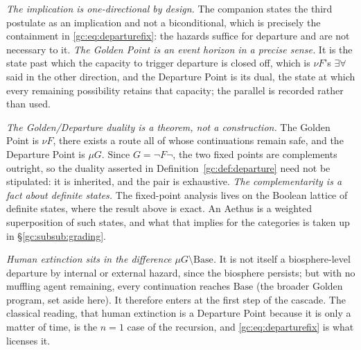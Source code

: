 \begin{remark}
\emph{The implication is one-directional by design.} The companion
states the third postulate as an implication and not a biconditional,
which is precisely the containment in \eqref{gc:eq:departurefix}: the
hazards suffice for departure and are not necessary to it. \emph{The Golden Point is an event horizon in a precise sense.} It is
the state past which the capacity to trigger departure is closed off,
which is $\nu F$'s $\exists\forall$ said in the other direction, and
the Departure Point is its dual, the state at which every remaining
possibility retains that capacity; the parallel is recorded rather than
used.

\emph{The Golden/Departure duality is a theorem, not a construction.}
The Golden Point is $\nu F$, there exists a route all of whose
continuations remain safe, and the Departure Point is $\mu G$. Since
$G=\neg F\neg$, the two fixed points are complements outright, so the
duality asserted in Definition~\ref{gc:def:departure} need not be
stipulated: it is inherited, and the pair is exhaustive. \emph{The complementarity is a fact about definite states.} The
fixed-point analysis lives on the Boolean lattice of definite states,
where the result above is exact. An Aethus is a weighted superposition
of such states, and what that implies for the categories is taken up in
\S\ref{gc:subsub:grading}.

\emph{Human extinction sits in the difference
$\mu G\setminus\mathrm{Base}$.} It is not itself a biosphere-level
departure by internal or external hazard,
since the biosphere persists; but with no muffling agent remaining,
every continuation reaches $\mathrm{Base}$
(the broader Golden program, set aside here). It therefore enters at the
first step of the cascade. The classical reading, that human
extinction is a Departure Point because it is only a matter of time, is the $n=1$ case of the recursion, and \eqref{gc:eq:departurefix} is
what licenses it.
\end{remark}

